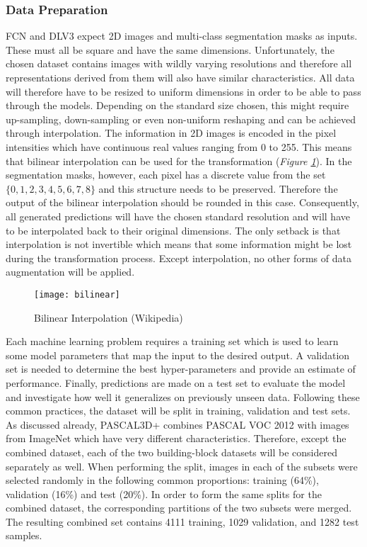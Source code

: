 \documentclass[main.tex]{subfiles}
\begin{document}
\subsubsection{Data Preparation}
FCN and DLV3 expect 2D images and multi-class segmentation masks as inputs. These must all be square and have the same dimensions. Unfortunately, the chosen dataset contains images with wildly varying resolutions and therefore all representations derived from them will also have similar characteristics. All data will therefore have to be resized to uniform dimensions in order to be able to pass through the models. Depending on the standard size chosen, this might require up-sampling, down-sampling or even non-uniform reshaping and can be achieved through interpolation. The information in 2D images is encoded in the pixel intensities which have continuous real values ranging from 0 to 255. This means that bilinear interpolation can be used for the transformation (\emph{Figure \ref{fig:interpolation}}). In the segmentation masks, however, each pixel has a discrete value from the set $\{0,1,2,3,4,5,6,7,8\}$ and this structure needs to be preserved. Therefore the output of the bilinear interpolation should be rounded in this case. Consequently, all generated predictions will have the chosen standard resolution and will have to be interpolated back to their original dimensions. The only setback is that interpolation is not invertible which means that some information might be lost during the transformation process. Except interpolation, no other forms of data augmentation will be applied.
\begin{figure}[H]
\centering
\texttt{[image: bilinear]}
\caption{Bilinear Interpolation (Wikipedia)}
\label{fig:interpolation}
\end{figure}
\indent Each machine learning problem requires a training set which is used to learn some model parameters that map the input to the desired output. A validation set is needed to determine the best hyper-parameters and provide an estimate of performance. Finally, predictions are made on a test set to evaluate the model and investigate how well it generalizes on previously unseen data. Following these common practices, the dataset will be split in training, validation and test sets. As discussed already, PASCAL3D+ combines PASCAL VOC 2012 with images from ImageNet which have very different characteristics. Therefore, except the combined dataset, each of the two building-block datasets will be considered separately as well. When performing the split, images in each of the subsets were selected randomly in the following common proportions: training (64\%), validation (16\%) and test (20\%). In order to form the same splits for the combined dataset, the corresponding partitions of the two subsets were merged. The resulting combined set contains 4111 training, 1029 validation, and 1282 test samples.
\end{document}
